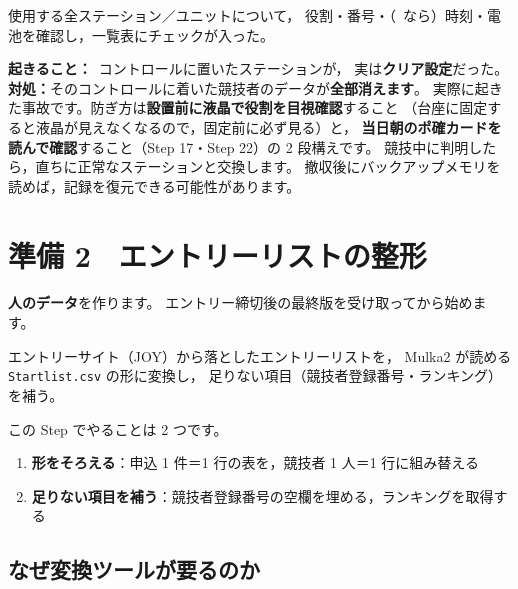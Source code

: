 \begin{Done}
使用する全ステーション／ユニットについて，
役割・番号・（\tSI\ なら）時刻・電池を確認し，一覧表にチェックが入った。
\end{Done}

\begin{Fail}
\textbf{起きること：}\tSI\ コントロールに置いたステーションが，
実は\textbf{クリア設定}だった。\\
\textbf{対処：}そのコントロールに着いた競技者のデータが\textbf{全部消えます}。
実際に起きた事故です。防ぎ方は\textbf{設置前に液晶で役割を目視確認}すること
（台座に固定すると液晶が見えなくなるので，固定前に必ず見る）と，
\textbf{当日朝のポ確カードを読んで確認}すること（Step 17・Step 22）の 2 段構えです。
競技中に判明したら，直ちに正常なステーションと交換します。
撤収後にバックアップメモリを読めば，記録を復元できる可能性があります。
\end{Fail}


\section{準備 2　エントリーリストの整形}

\textbf{人のデータ}を作ります。
エントリー締切後の最終版を受け取ってから始めます。


\begin{Goal}
エントリーサイト（JOY）から落としたエントリーリストを，
Mulka2 が読める \texttt{Startlist.csv} の形に変換し，
足りない項目（競技者登録番号・ランキング）を補う。
\end{Goal}

この Step でやることは 2 つです。

\begin{enumerate}
\item \textbf{形をそろえる}：申込 1 件＝1 行の表を，競技者 1 人＝1 行に組み替える
\item \textbf{足りない項目を補う}：競技者登録番号の空欄を埋める，ランキングを取得する \tRANK
\end{enumerate}

\subsection*{なぜ変換ツールが要るのか}


